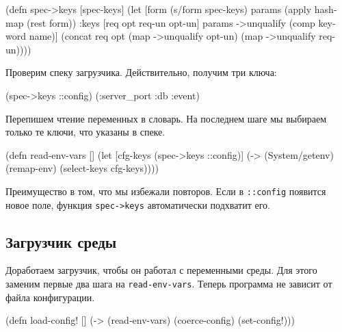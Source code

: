 \else

\begin{english}
  \begin{clojure}
(defn spec->keys
  [spec-keys]
  (let [form (s/form spec-keys)
        params (apply hash-map (rest form))
        {:keys [req opt req-un opt-un]} params
        ->unqualify (comp keyword name)]
    (concat req opt
            (map ->unqualify opt-un)
            (map ->unqualify req-un))))
  \end{clojure}
\end{english}

\fi

\noindent
Проверим спеку загрузчика. Действительно, получим три ключа:

\begin{english}
  \begin{clojure}
(spec->keys ::config)
(:server_port :db :event)
  \end{clojure}
\end{english}

\noindent
Перепишем чтение переменных в словарь. На последнем шаге мы выбираем только те
ключи, что указаны в спеке.

\begin{english}
  \begin{clojure}
(defn read-env-vars []
  (let [cfg-keys (spec->keys ::config)]
    (-> (System/getenv)
        (remap-env)
        (select-keys cfg-keys))))
  \end{clojure}
\end{english}

Преимущество в том, что мы избежали повторов. Если в \verb|::config| появится
новое поле, функция \verb|spec->keys| автоматически подхватит его.

\subsection{Загрузчик среды}

Доработаем загрузчик, чтобы он работал с переменными среды. Для этого заменим
первые два шага на \verb|read-env-vars|. Теперь программа не зависит от файла
конфигурации.

\begin{english}
  \begin{clojure}
(defn load-config! []
  (-> (read-env-vars)
      (coerce-config)
      (set-config!)))
  \end{clojure}
\end{english}

